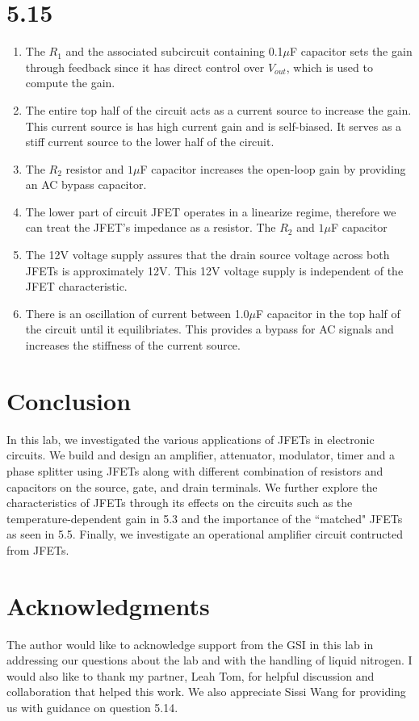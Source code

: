 \documentclass[authoryear, 12pt,5p, times]{elsarticle}
\begin{document}
\section*{5.15}
\begin{enumerate}
\item The $R_1$ and the associated subcircuit containing 0.1$\mu$F capacitor sets the gain through feedback since it has direct control over $V_{out}$, which is used to compute the gain.
\item The entire top half of the circuit acts as a current source to increase the gain. This current source is has high current gain and is self-biased.  It serves as a stiff current source to the lower half of the circuit.
\item The $R_2$ resistor and $1\mu$F capacitor increases the open-loop gain by providing an AC bypass capacitor.
\item  The lower part of circuit JFET operates in a linearize regime, therefore we can treat the JFET's impedance as a resistor. The $R_2$ and $1\mu$F capacitor
\item The 12V voltage supply assures that the drain source voltage across both JFETs is approximately 12V. This 12V voltage supply is independent of the JFET characteristic. 
\item There is an oscillation of current between 1.0$\mu$F capacitor in the top half of the circuit until it equilibriates. This provides a bypass for AC signals and increases the stiffness of the current source.
\end{enumerate} 
 \section*{Conclusion}
In this lab, we investigated the various applications of JFETs in electronic circuits. We build and design an amplifier, attenuator, modulator, timer and a phase splitter using JFETs along with different combination of resistors and capacitors on the source, gate, and drain terminals. We further explore the characteristics of JFETs through its effects on the circuits such as the temperature-dependent gain in 5.3 and the importance of the ``matched" JFETs as seen in 5.5. Finally, we investigate an operational amplifier circuit contructed from JFETs.
\section*{Acknowledgments}
\begin{footnotesize}
The author would like to acknowledge support from the GSI in this lab in addressing our questions about the lab and with the handling of liquid nitrogen. I would also like to thank my partner, Leah Tom, for helpful discussion and collaboration that helped this work. We also appreciate Sissi Wang for providing us with guidance on question 5.14.
\end{footnotesize}
\end{document}
